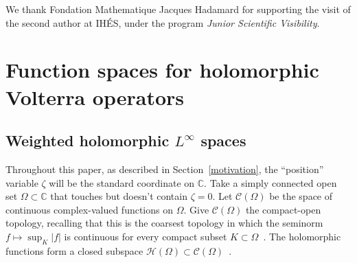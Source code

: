 \documentclass{article}
\theoremstyle{plain}
\newcommand{\C}{\mathbb{C}}
\newcommand{\cont}{\mathcal{C}}
\newcommand{\holo}{\mathcal{H}}
\begin{document}
We thank Fondation Mathematique Jacques Hadamard for supporting the visit of the second author at IH\'ES, under the program \textit{Junior Scientific Visibility}.  


\section{Function spaces for holomorphic Volterra operators}\label{fn-spaces}
\subsection{Weighted holomorphic $L^\infty$ spaces}
Throughout this paper, as described in Section~\ref{motivation}, the ``position'' variable $\zeta$ will be the standard coordinate on $\C$. Take a simply connected open set $\Omega \subset \C$ that touches but doesn't contain $\zeta = 0$. Let $\cont(\Omega)$ be the space of continuous complex-valued functions on $\Omega$. Give $\cont(\Omega)$ the compact-open topology, recalling that this is the coarsest topology in which the seminorm $f \mapsto \sup_K |f|$ is continuous for every compact subset $K \subset \Omega$~\cite[Example~2.6 and \S 4 notes]{fnl-cpx-anal}. The holomorphic functions form a closed subspace $\holo(\Omega) \subset \cont(\Omega)$~\cite[Proposition~3.14]{fnl-cpx-anal}.
\end{document}
